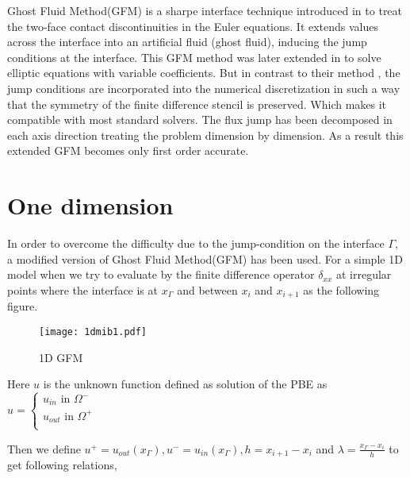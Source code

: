 Ghost Fluid Method(GFM) is a sharpe interface technique introduced in  \cite{Fedkiw1999} to treat the two-face contact discontinuities in the Euler equations. It extends values across the interface into an artificial fluid (ghost fluid), inducing the jump conditions at the interface. This GFM method was later extended in \cite{Liu2000} to solve elliptic equations with variable coefficients. But in contrast to their method \cite{Liu2000} , the jump conditions are incorporated into the numerical discretization in such a way that the symmetry of the finite difference stencil is preserved. Which makes it compatible with most standard solvers. The flux jump has been decomposed in each axis direction treating the problem dimension by dimension. As a result this extended GFM becomes only first order accurate.   


\section{One dimension}

 
In order to overcome the difficulty due to the jump-condition on the interface $\Gamma$, a modified version of Ghost Fluid Method(GFM) has been used. For a simple 1D model when we try to evaluate by the finite difference operator $\delta_{xx}$ at irregular points where the interface is at $x_\Gamma$ and between $x_i$ and $x_{i+1}$ as the following figure.  %

\begin{figure}[ht]
\begin{center}
\texttt{[image: 1dmib1.pdf]}
\caption{1D GFM}
\label{fig_1}
\end{center}
\end{figure}


Here $u$ is the unknown function defined as solution of the PBE as $u=\begin{cases}
u_{in} \text{ in }\Omega^-\\
u_{out}\text{ in }\Omega^+\\
\end{cases}$

Then we define $u^+ = u_{out}(x_\Gamma),u^- = u_{in}(x_\Gamma),h=x_{i+1}-x_i$ and  $\lambda =\frac{x_\Gamma-x_i}{h}$ to get following relations,
 



